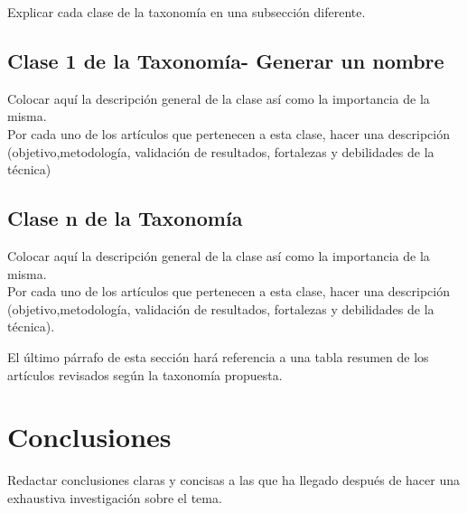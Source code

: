 \documentclass[conference]{IEEEtran}
\begin{document}
Explicar cada clase de la taxonomía en una subsección diferente.

\subsection{Clase 1 de la Taxonomía- Generar un nombre}
Colocar aquí la descripción general de la clase así como la importancia de la misma. \\
Por cada uno de los artículos que pertenecen a esta clase, hacer una descripción (objetivo,metodología, validación de resultados, fortalezas y debilidades de la técnica) 


\subsection{Clase n de la Taxonomía}
Colocar aquí la descripción general de la clase así como la importancia de la misma. \\
Por cada uno de los artículos que pertenecen a esta clase, hacer una descripción (objetivo,metodología, validación de resultados, fortalezas y debilidades de la técnica)\cite{HuangEtAl2007}.

El último párrafo de esta sección hará referencia a una tabla resumen de los artículos revisados según la taxonomía propuesta.

\section{Conclusiones }
Redactar conclusiones claras y concisas a las que ha llegado después de hacer una exhaustiva investigación sobre el tema.


 

\end{document}
